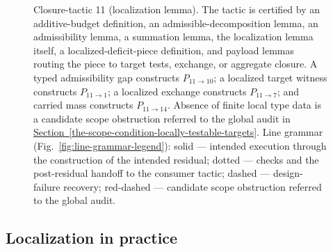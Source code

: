 \documentclass[
  11pt,
]{article}
\theoremstyle{definition}
\newcommand{\secref}[1]{\hyperref[#1]{Section~\ref*{#1}}}
\begin{document}
\begin{figure}[p]
{%
}
\caption[Closure-tactic 11: localization lemma]{Closure-tactic 11 (localization lemma).  The tactic is certified by an additive-budget definition, an admissible-decomposition lemma, an admissibility lemma, a summation lemma, the localization lemma itself, a localized-deficit-piece definition, and payload lemmas routing the piece to target tests, exchange, or aggregate closure.  A typed admissibility gap constructs \(P_{11\to10}\); a localized target witness constructs \(P_{11\to1}\); a localized exchange constructs \(P_{11\to7}\); and carried mass constructs \(P_{11\to14}\).  Absence of finite local type data is a candidate scope obstruction referred to the global audit in \secref{the-scope-condition-locally-testable-targets}.  Line grammar (Fig.~\ref{fig:line-grammar-legend}): solid --- intended execution through the construction of the intended residual; dotted --- checks and the post-residual handoff to the consumer tactic; dashed --- design-failure recovery; red-dashed --- candidate scope obstruction referred to the global audit.}
\label{fig:ct11-localization}
\end{figure}
\FloatBarrier

\subsection*{Localization in practice}
\end{document}
